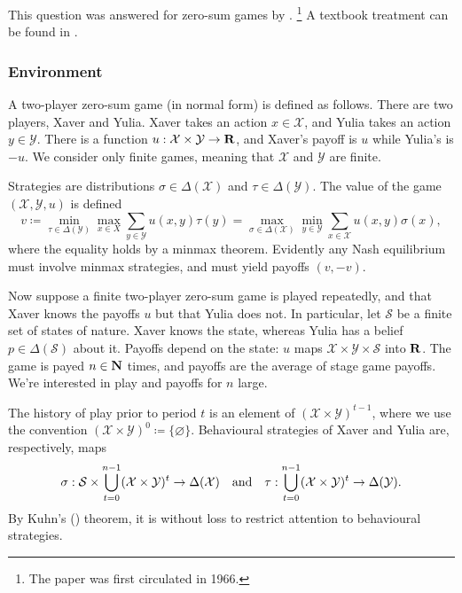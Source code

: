 \documentclass[11pt,letterpaper,reqno,oneside]{article}
\begin{document}
This question was answered for zero-sum games by \textcite{AumannMaschler1995}.%
	\footnote{The paper was first circulated in 1966.}
A textbook treatment can be found in \textcite[][ch. 3]{Sorin2002}.


\subsubsection{Environment}
\label{sec:learning:AumannMaschler:environment}

A two-player zero-sum game (in normal form) is defined as follows. There are two players, Xaver and Yulia. Xaver takes an action $x \in \mathcal{X}$, and Yulia takes an action $y \in \mathcal{Y}$. There is a function $u : \mathcal{X} \times \mathcal{Y} \to \mathbf{R}$, and Xaver's payoff is $u$ while Yulia's is $-u$. We consider only finite games, meaning that $\mathcal{X}$ and $\mathcal{Y}$ are finite.

Strategies are distributions $\sigma \in \Delta(\mathcal{X})$ and $\tau \in \Delta(\mathcal{Y})$. The value of the game $(\mathcal{X},\mathcal{Y},u)$ is defined
%
\begin{equation*}
	v
	\coloneqq \min_{ \tau \in \Delta(\mathcal{Y}) } \max_{ x \in X } 
	\sum_{y \in \mathcal{Y}} u(x,y) \tau(y)
	= \max_{ \sigma \in \Delta(\mathcal{X}) } \min_{ y \in \mathcal{Y} } 
	\sum_{x \in \mathcal{X}} u(x,y) \sigma(x) ,
\end{equation*}
%
where the equality holds by a minmax theorem. Evidently any Nash equilibrium must involve minmax strategies, and must yield payoffs $(v,-v)$.

Now suppose a finite two-player zero-sum game is played repeatedly, and that Xaver knows the payoffs $u$ but that Yulia does not. In particular, let $\mathcal{S}$ be a finite set of states of nature. Xaver knows the state, whereas Yulia has a belief $p \in \Delta(\mathcal{S})$ about it. Payoffs depend on the state: $u$ maps $\mathcal{X} \times \mathcal{Y} \times \mathcal{S}$ into $\mathbf{R}$. The game is payed $n \in \mathbf{N}$ times, and payoffs are the average of stage game payoffs. We're interested in play and payoffs for $n$ large.

The history of play prior to period $t$ is an element of $(\mathcal{X} \times \mathcal{Y})^{t-1}$, where we use the convention $( \mathcal{X} \times \mathcal{Y} )^0 \coloneqq \{\varnothing\}$. Behavioural strategies of Xaver and Yulia are, respectively, maps
%
\begin{equation*}
	\sigma : \mathcal{S} \times \bigcup_{t=0}^{n-1} 
	(\mathcal{X} \times \mathcal{Y})^t \to \Delta(\mathcal{X})
	\quad\text{and}\quad
	\tau : \bigcup_{t=0}^{n-1} 
	(\mathcal{X} \times \mathcal{Y})^t \to \Delta(\mathcal{Y}) .
\end{equation*}
%
By Kuhn's (\citeyear{Kuhn1953}) theorem, it is without loss to restrict attention to behavioural strategies.
\end{document}
